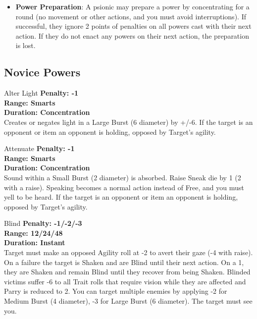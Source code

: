 \begin{multicols}{2}
\begin{itemize}
  \item \textbf{Power Preparation}: A psionic may prepare a power by concentrating for a round (no movement or other actions, and you must avoid interruptions). If successful, they ignore 2 points of penalties on all powers cast with their next action. If they do not enact any powers on their next action, the preparation is lost.

\end{itemize}

\subsection{Novice Powers}

\begin{genericsection}{Alter Light}
\textbf{Penalty: -1}\\
\textbf{Range: Smarts}\\
\textbf{Duration: Concentration}\\
Creates or negates light in a Large Burst (6 diameter) by +/-6. If the target is an opponent or item an opponent is holding, opposed by Target's agility.
\end{genericsection}

\begin{genericsection}{Attenuate}
\textbf{Penalty: -1}\\
\textbf{Range: Smarts}\\
\textbf{Duration: Concentration}\\
Sound within a Small Burst (2 diameter) is absorbed. Raise Sneak die by 1 (2 with a raise). Speaking becomes a normal action instead of Free, and you must yell to be heard. If the target is an opponent or item an opponent is holding, opposed by Target's agility.
\end{genericsection}

\begin{genericsection}{Blind}
\textbf{Penalty: -1/-2/-3}\\
\textbf{Range: 12/24/48}\\
\textbf{Duration: Instant}\\
Target must make an opposed Agility roll at -2 to avert their gaze (-4 with raise). On a failure the target is Shaken and are Blind until their next action. On a 1, they are Shaken and remain Blind until they recover from being Shaken. Blinded victims suffer -6 to all Trait rolls that require vision while they are affected and Parry is reduced to 2. You can target multiple enemies by applying -2 for Medium Burst (4 diameter), -3 for Large Burst (6 diameter). The target must see you.
\end{genericsection}


\end{multicols}
